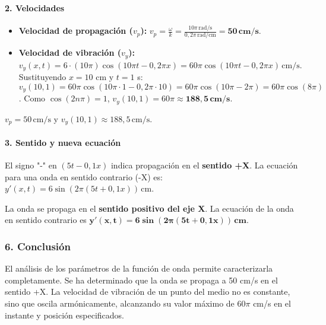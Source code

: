 \paragraph{2. Velocidades}
\begin{itemize}
    \item \textbf{Velocidad de propagación ($v_p$):} $v_p = \frac{\omega}{k} = \frac{10\pi \, \text{rad/s}}{0,2\pi \, \text{rad/cm}} = \boldsymbol{50 \, \textbf{cm/s}}$.
    \item \textbf{Velocidad de vibración ($v_y$):} $v_y(x,t) = 6 \cdot (10\pi) \cos(10\pi t - 0,2\pi x) = 60\pi \cos(10\pi t - 0,2\pi x) \, \text{cm/s}$.
    Sustituyendo $x=10$ cm y $t=1$ s:
    $ v_y(10, 1) = 60\pi \cos(10\pi \cdot 1 - 0,2\pi \cdot 10) = 60\pi \cos(10\pi - 2\pi) = 60\pi \cos(8\pi) $.
    Como $\cos(2n\pi)=1$, $v_y(10,1) = 60\pi \approx \boldsymbol{188,5 \, \textbf{cm/s}}$.
\end{itemize}
\begin{cajaresultado}
    $v_p = 50\,\text{cm/s}$ y $v_y(10,1) \approx 188,5\,\text{cm/s}$.
\end{cajaresultado}

\paragraph{3. Sentido y nueva ecuación}
El signo "-" en $(5t-0,1x)$ indica propagación en el \textbf{sentido +X}.
La ecuación para una onda en sentido contrario (-X) es:
$ y'(x,t) = 6\sin(2\pi(5t+0,1x))\,\text{cm} $.
\begin{cajaresultado}
    La onda se propaga en el \textbf{sentido positivo del eje X}. La ecuación de la onda en sentido contrario es $\boldsymbol{y'(x,t) = 6\sin(2\pi(5t+0,1x))\,\textbf{cm}}$.
\end{cajaresultado}

\subsubsection*{6. Conclusión}
\begin{cajaconclusion}
El análisis de los parámetros de la función de onda permite caracterizarla completamente. Se ha determinado que la onda se propaga a 50 cm/s en el sentido +X. La velocidad de vibración de un punto del medio no es constante, sino que oscila armónicamente, alcanzando su valor máximo de $60\pi$ cm/s en el instante y posición especificados.
\end{cajaconclusion}

\newpage

